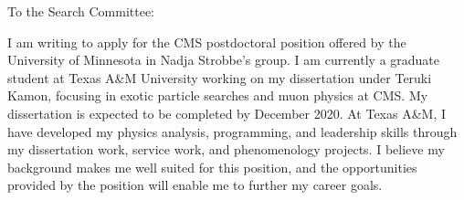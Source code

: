 \documentclass[11pt]{article}
\begin{document}






\bigskip

To the Search Committee: 

I am writing to apply for the CMS postdoctoral position offered by the University of Minnesota in Nadja Strobbe’s group. I am currently a graduate student at Texas A\&M University working on my dissertation under Teruki Kamon, focusing in exotic particle searches and muon physics at CMS. My dissertation is expected to be completed by December 2020. At Texas A\&M, I have developed my physics analysis, programming, and leadership skills through my dissertation work, service work, and phenomenology projects.  I believe my background makes me well suited for this position, and the opportunities provided by the position will enable me to further my career goals. 
\end{document}
